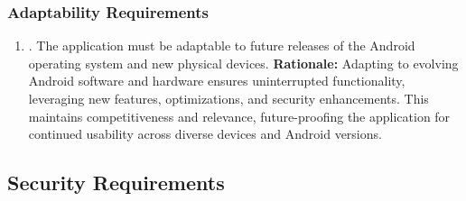\documentclass[]{article}
\begin{document}
\subsubsection{Adaptability Requirements}
\label{ssub:adaptability_requirements}
\begin{enumerate}[{MS-A}1. ]
	\item . The application must be adaptable to future releases of the Android operating system and new physical devices. \newline
	      \textbf{Rationale:} Adapting to evolving Android software and hardware ensures uninterrupted functionality, leveraging new features, optimizations, and security enhancements. This maintains competitiveness and relevance, future-proofing the application for continued usability across diverse devices and Android versions.
\end{enumerate}


\subsection{Security Requirements}
\label{sub:security_requirements}
\end{document}
